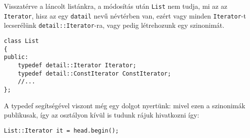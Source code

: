 \documentclass[../cpp_book/cpp_book.tex]{subfiles}
\begin{document}
	Visszatérve a láncolt listánkra, a módosítás után \texttt{List} nem tudja, mi az az \texttt{Iterator}, hisz az egy \texttt{datail} nevű névtérben van, ezért vagy minden \texttt{Iterator}-t lecserélünk \texttt{detail::Iterator}-ra, vagy pedig létrehozunk egy szinonimát.
	\begin{lstlisting}
class List
{
public:
	typedef detail::Iterator Iterator;
	typedef detail::ConstIterator ConstIterator;
	//...
};
	\end{lstlisting}
	A typedef segítségével viszont még egy dolgot nyertünk: mivel ezen a szinonimák publikusak, így az osztályon kívül is tudunk rájuk hivatkozni így:
	\begin{lstlisting}
List::Iterator it = head.begin();
	\end{lstlisting}
	
	
\end{document}
